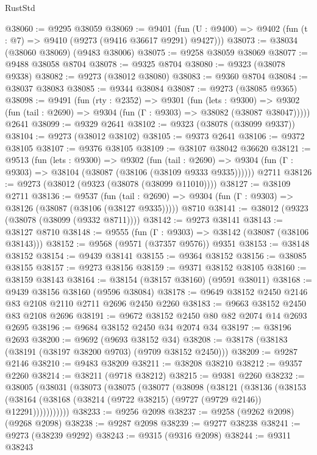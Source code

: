 \begin{lexlean}{RustStd}
\begin{coremodule}
@38060 := @9295 @38059
@38069 := @9401
    (fun (U : @9400) => @9402 (fun (t : @7) => @9410 (@9273 (@9416 @36617 @9291) @9427)))
@38073 := @38034 (@38060 @38069) (@9483 @38006)
@38075 := @9258 @38059 @38069
@38077 := @9488 @38058 @8704
@38078 := @9325 @8704
@38080 := @9323 (@38078 @9338)
@38082 := @9273 (@38012 @38080)
@38083 := @9360 @8704
@38084 := @38037 @38083
@38085 := @9344 @38084
@38087 := @9273 (@38085 @9365)
@38098 := @9491
    (fun (rty : @2352) =>
    @9301
      (fun (lets : @9300) =>
      @9302 (fun (tail : @2690) => @9304 (fun (Γ : @9303) => @38082 (@38087 @38047)))))
    @2641
@38099 := @9329 @2641
@38102 := @9323 (@38078 (@38099 @9337))
@38104 := @9273 (@38012 @38102)
@38105 := @9373 @2641
@38106 := @9372 @38105
@38107 := @9376 @38105
@38109 := @38107 @38042 @36620
@38121 := @9513
    (fun (lets : @9300) =>
    @9302
      (fun (tail : @2690) =>
      @9304 (fun (Γ : @9303) => @38104 (@38087 (@38106 (@38109 @9333 @9335))))))
    @2711
@38126 := @9273 (@38012 (@9323 (@38078 (@38099 @11010))))
@38127 := @38109 @2711
@38136 := @9537
    (fun (tail : @2690) => @9304 (fun (Γ : @9303) => @38126 (@38087 (@38106 (@38127 @9335)))))
    @8710
@38141 := @38012 (@9323 (@38078 (@38099 (@9332 @8711))))
@38142 := @9273 @38141
@38143 := @38127 @8710
@38148 := @9555 (fun (Γ : @9303) => @38142 (@38087 (@38106 @38143)))
@38152 := @9568 (@9571 (@37357 @9576)) @9351
@38153 := @38148 @38152
@38154 := @9439 @38141
@38155 := @9364 @38152
@38156 := @38085 @38155
@38157 := @9273 @38156
@38159 := @9371 @38152 @38105
@38160 := @38159 @38143
@38164 := @38154 (@38157 @38160) (@9591 @38011)
@38168 := @9439 @38156 @38160 (@9596 @38084)
@38178 := @9649 @38152 @2450 @2146 @83 @2108 @2110 @2711 @2696 @2450 @2260
@38183 := @9663 @38152 @2450 @83 @2108 @2696
@38191 := @9672 @38152 @2450 @80 @82 @2074 @14 @2693 @2695
@38196 := @9684 @38152 @2450 @34 @2074 @34
@38197 := @38196 @2693
@38200 := @9692 (@9693 @38152 @34)
@38208 := @38178 (@38183 (@38191 (@38197 @38200 @9703) (@9709 @38152 @2450)))
@38209 := @9287 @2146
@38210 := @9483 @38209
@38211 := @38208 @38210
@38212 := @9357 @2260
@38214 := @38211 (@9718 @38212)
@38215 := @9381 @2260
@38232 := @38005
    (@38031
      (@38073
        (@38075
          (@38077
            (@38098
              (@38121
                (@38136
                  (@38153
                    (@38164 (@38168 (@38214 (@9722 @38215) (@9727 (@9729 @2146)) @12291)))))))))))
@38233 := @9256 @2098
@38237 := @9258 (@9262 @2098) (@9268 @2098)
@38238 := @9287 @2098
@38239 := @9277 @38238
@38241 := @9273 (@38239 @9292)
@38243 := @9315 (@9316 @2098)
@38244 := @9311 @38243

\end{coremodule}
\end{lexlean}
